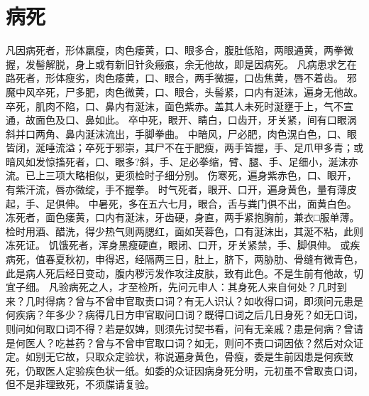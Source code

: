 \documentclass[12pt,UTF8]{ctexbook}
\begin{document}
\chapter{病死}

凡因病死者，形体羸瘦，肉色痿黄，口、眼多合，腹肚低陷，两眼通黄，两拳微握，发髻解脱，身上或有新旧针灸瘢痕，余无他故，即是因病死。
凡病患求乞在路死者，形体瘦劣，肉色痿黄，口、眼合，两手微握，口齿焦黄，唇不着齿。
邪魔中风卒死，尸多肥，肉色微黄，口、眼合，头髻紧，口内有涎沫，遍身无他故。
卒死，肌肉不陷，口、鼻内有涎沫，面色紫赤。盖其人未死时涎壅于上，气不宣通，故面色及口、鼻如此。
卒中死，眼开、睛白，口齿开，牙关紧，间有口眼涡斜并口两角、鼻内涎沫流出，手脚拳曲。
中暗风，尸必肥，肉色滉白色，口、眼皆闭，涎唾流溢；卒死于邪崇，其尸不在于肥瘦，两手皆握，手、足爪甲多青；或暗风如发惊搐死者，口、眼多?斜，手、足必拳缩，臂、腿、手、足细小，涎沫亦流。已上三项大略相似，更须检时子细分别。
伤寒死，遍身紫赤色，口、眼开，有紫汗流，唇亦微绽，手不握拳。
时气死者，眼开、口开，遍身黄色，量有薄皮起，手、足俱伸。
中暑死，多在五六七月，眼合，舌与粪门俱不出，面黄白色。
冻死者，面色痿黄，口内有涎沫，牙齿硬，身直，两手紧抱胸前，兼衣□服单薄。检时用酒、醋洗，得少热气则两腮红，面如芙蓉色，口有涎沫出，其涎不粘，此则冻死证。
饥饿死者，浑身黑瘦硬直，眼闭、口开，牙关紧禁，手、脚俱伸。
或疾病死，值春夏秋初，申得迟，经隔两三日，肚上，脐下，两胁肋、骨缝有微青色，此是病人死后经日变动，腹内秽污发作攻注皮肤，致有此色。不是生前有他故，切宜子细。
凡验病死之人，才至检所，先问元申人：其身死人来自何处？几时到来？几时得病？曾与不曾申官取责口词？有无人识认？如收得口词，即须问元患是何疾病？年多少？病得几日方申官取问口词？既得口词之后几日身死？如无口词，则问如何取口词不得？若是奴婢，则须先讨契书看，问有无亲戚？患是何病？曾请是何医人？吃甚药？曾与不曾申官取口词？如无，则问不责口词因依？然后对众证定。如别无它故，只取众定验状，称说遍身黄色，骨瘦，委是生前因患是何疾致死，仍取医人定验疾色状一纸。如委的众证因病身死分明，元初虽不曾取责口词，但不是非理致死，不须牒请复验。
\end{document}
